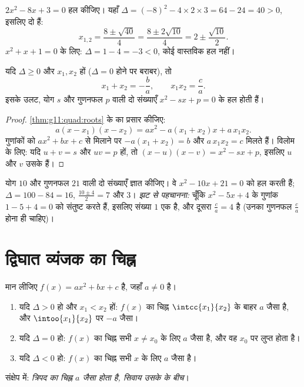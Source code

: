 \begin{example}\label{ex:g11:quad:solving}
$2x^2 - 8x + 3 = 0$ हल कीजिए। यहाँ $\Delta = (-8)^2 - 4 \times 2 \times 3 =
64 - 24 = 40 > 0$, इसलिए दो  हैं:
\[
x_{1,2} = \frac{8 \pm \sqrt{40}}{4} = \frac{8 \pm 2\sqrt{10}}{4}
= 2 \pm \frac{\sqrt{10}}{2}.
\]
$x^2 + x + 1 = 0$ के लिए: $\Delta = 1 - 4 = -3 < 0$, कोई वास्तविक हल नहीं।
\end{example}

\begin{proposition}[मूलों का योग और गुणनफल]\label{prop:g11:quad:vieta}
यदि $\Delta \geq 0$ और $x_1, x_2$  हों ($\Delta = 0$ होने पर बराबर), तो
\[
x_1 + x_2 = -\frac{b}{a},
\qquad
x_1 x_2 = \frac{c}{a} .
\]
इसके उलट, योग $s$ और गुणनफल $p$ वाली दो संख्याएँ $x^2 - sx + p = 0$ के हल होती हैं।
\end{proposition}

\begin{proof}
\cref{thm:g11:quad:roots} के  का प्रसार कीजिए:
\[
a(x - x_1)(x - x_2) = a x^2 - a(x_1 + x_2)x + a\,x_1 x_2 .
\]
गुणांकों को $ax^2 + bx + c$ से मिलाने पर $-a(x_1+x_2) = b$ और $a\,x_1x_2 = c$ मिलते हैं। विलोम के लिए: यदि
$u + v = s$ और $uv = p$ हों, तो $(x-u)(x-v) = x^2 - sx + p$, इसलिए $u$ और $v$ उसके  हैं।
\end{proof}

\begin{example}
योग $10$ और गुणनफल $21$ वाली दो संख्याएँ ज्ञात कीजिए। वे $x^2 - 10x + 21 = 0$ को हल
करती हैं; $\Delta = 100 - 84 = 16$,  $\frac{10 \pm 4}{2} = 7$ और $3$। \emph{ झट से पहचानना:} चूँकि $x^2 - 5x + 4$
के गुणांक $1 - 5 + 4 = 0$ को संतुष्ट करते हैं, इसलिए संख्या $1$ एक  है, और दूसरा
$\frac{c}{a} = 4$ है (उनका गुणनफल $\frac ca$ होना ही चाहिए)।
\end{example}

\section{द्विघात व्यंजक का चिह्न}

\begin{theorem}[त्रिपद का चिह्न]\label{thm:g11:quad:sign}
मान लीजिए $f(x) = ax^2+bx+c$ है, जहाँ $a \neq 0$ है।
\begin{enumerate}
  \item यदि $\Delta > 0$ हो और  $x_1 < x_2$ हों: $f(x)$ का चिह्न $\intcc{x_1}{x_2}$ के बाहर $a$
        जैसा है, और $\intoo{x_1}{x_2}$ पर $-a$ जैसा।
  \item यदि $\Delta = 0$ हो: $f(x)$ का चिह्न सभी $x \neq x_0$ के लिए $a$ जैसा है, और वह
        $x_0$ पर लुप्त होता है।
  \item यदि $\Delta < 0$ हो: $f(x)$ का चिह्न सभी $x$ के लिए $a$ जैसा है।
\end{enumerate}
संक्षेप में: \emph{त्रिपद का चिह्न $a$ जैसा होता है, सिवाय उसके  के
बीच}।
\end{theorem}

